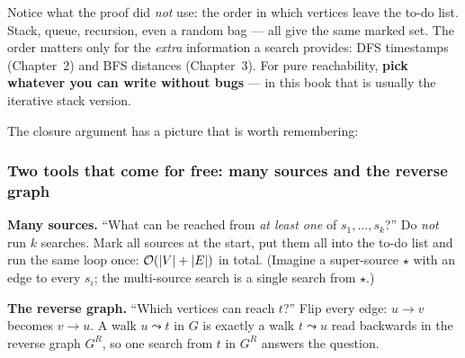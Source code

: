 Notice what the proof did \emph{not} use: the order in which vertices leave the to-do list. Stack, queue, recursion, even a random bag --- all give the same marked set. The order matters only for the \emph{extra} information a search provides: DFS timestamps (Chapter~2) and BFS distances (Chapter~3). For pure reachability, \textbf{pick whatever you can write without bugs} --- in this book that is usually the iterative stack version.

The closure argument has a picture that is worth remembering:

\begin{diagrambox}
\end{diagrambox}

\subsubsection*{Two tools that come for free: many sources and the reverse graph}

\textbf{Many sources.} ``What can be reached from \emph{at least one} of $s_1, \dots, s_k$?'' Do \emph{not} run $k$ searches. Mark all sources at the start, put them all into the to-do list and run the same loop once: $\mathcal{O}(|V|+|E|)$ in total. (Imagine a super-source $\star$ with an edge to every $s_i$; the multi-source search is a single search from $\star$.)

\textbf{The reverse graph.} ``Which vertices can reach $t$?'' Flip every edge: $u \to v$ becomes $v \to u$. A walk $u \leadsto t$ in $G$ is exactly a walk $t \leadsto u$ read backwards in the reverse graph $G^{R}$, so one search from $t$ in $G^{R}$ answers the question.

